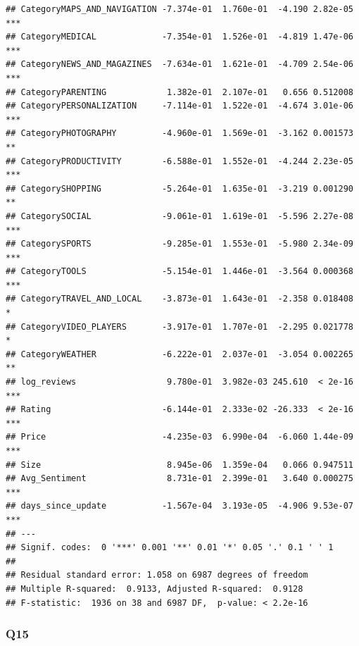\documentclass[
]{article}
\begin{document}
\begin{verbatim}
## CategoryMAPS_AND_NAVIGATION -7.374e-01  1.760e-01  -4.190 2.82e-05 ***
## CategoryMEDICAL             -7.354e-01  1.526e-01  -4.819 1.47e-06 ***
## CategoryNEWS_AND_MAGAZINES  -7.634e-01  1.621e-01  -4.709 2.54e-06 ***
## CategoryPARENTING            1.382e-01  2.107e-01   0.656 0.512008    
## CategoryPERSONALIZATION     -7.114e-01  1.522e-01  -4.674 3.01e-06 ***
## CategoryPHOTOGRAPHY         -4.960e-01  1.569e-01  -3.162 0.001573 ** 
## CategoryPRODUCTIVITY        -6.588e-01  1.552e-01  -4.244 2.23e-05 ***
## CategorySHOPPING            -5.264e-01  1.635e-01  -3.219 0.001290 ** 
## CategorySOCIAL              -9.061e-01  1.619e-01  -5.596 2.27e-08 ***
## CategorySPORTS              -9.285e-01  1.553e-01  -5.980 2.34e-09 ***
## CategoryTOOLS               -5.154e-01  1.446e-01  -3.564 0.000368 ***
## CategoryTRAVEL_AND_LOCAL    -3.873e-01  1.643e-01  -2.358 0.018408 *  
## CategoryVIDEO_PLAYERS       -3.917e-01  1.707e-01  -2.295 0.021778 *  
## CategoryWEATHER             -6.222e-01  2.037e-01  -3.054 0.002265 ** 
## log_reviews                  9.780e-01  3.982e-03 245.610  < 2e-16 ***
## Rating                      -6.144e-01  2.333e-02 -26.333  < 2e-16 ***
## Price                       -4.235e-03  6.990e-04  -6.060 1.44e-09 ***
## Size                         8.945e-06  1.359e-04   0.066 0.947511    
## Avg_Sentiment                8.731e-01  2.399e-01   3.640 0.000275 ***
## days_since_update           -1.567e-04  3.193e-05  -4.906 9.53e-07 ***
## ---
## Signif. codes:  0 '***' 0.001 '**' 0.01 '*' 0.05 '.' 0.1 ' ' 1
## 
## Residual standard error: 1.058 on 6987 degrees of freedom
## Multiple R-squared:  0.9133, Adjusted R-squared:  0.9128 
## F-statistic:  1936 on 38 and 6987 DF,  p-value: < 2.2e-16
\end{verbatim}

\subsubsection{Q15}\label{q15}
\end{document}
